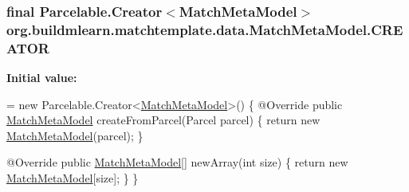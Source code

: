 \subsubsection[{\texorpdfstring{C\+R\+E\+A\+T\+OR}{CREATOR}}]{\setlength{\rightskip}{0pt plus 5cm}final Parcelable.\+Creator$<${\bf Match\+Meta\+Model}$>$ org.\+buildmlearn.\+matchtemplate.\+data.\+Match\+Meta\+Model.\+C\+R\+E\+A\+T\+OR\hspace{0.3cm}{\ttfamily [static]}}\hypertarget{classorg_1_1buildmlearn_1_1matchtemplate_1_1data_1_1MatchMetaModel_a4a726989c547dce464966d1c9f7682f5}{}\label{classorg_1_1buildmlearn_1_1matchtemplate_1_1data_1_1MatchMetaModel_a4a726989c547dce464966d1c9f7682f5}
{\bfseries Initial value\+:}
\begin{DoxyCode}
= \textcolor{keyword}{new} Parcelable.Creator<\hyperlink{classorg_1_1buildmlearn_1_1matchtemplate_1_1data_1_1MatchMetaModel_abeb31e4694d0799936d023712520a383}{MatchMetaModel}>() \{
        @Override
        \textcolor{keyword}{public} \hyperlink{classorg_1_1buildmlearn_1_1matchtemplate_1_1data_1_1MatchMetaModel_abeb31e4694d0799936d023712520a383}{MatchMetaModel} createFromParcel(Parcel parcel) \{
            \textcolor{keywordflow}{return} \textcolor{keyword}{new} \hyperlink{classorg_1_1buildmlearn_1_1matchtemplate_1_1data_1_1MatchMetaModel_abeb31e4694d0799936d023712520a383}{MatchMetaModel}(parcel);
        \}

        @Override
        \textcolor{keyword}{public} \hyperlink{classorg_1_1buildmlearn_1_1matchtemplate_1_1data_1_1MatchMetaModel_abeb31e4694d0799936d023712520a383}{MatchMetaModel}[] newArray(\textcolor{keywordtype}{int} size) \{
            \textcolor{keywordflow}{return} \textcolor{keyword}{new} \hyperlink{classorg_1_1buildmlearn_1_1matchtemplate_1_1data_1_1MatchMetaModel_abeb31e4694d0799936d023712520a383}{MatchMetaModel}[size];
        \}
    \}
\end{DoxyCode}
